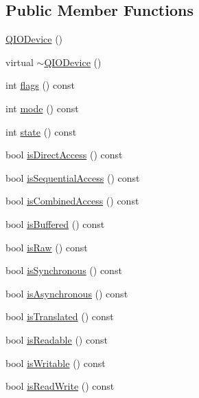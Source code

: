 \subsection*{Public Member Functions}
\begin{DoxyCompactItemize}
\item 
\mbox{\hyperlink{class_q_i_o_device_a6ccc9ce76acdca224d0c3ded7d303f02}{Q\+I\+O\+Device}} ()
\item 
virtual \mbox{\hyperlink{class_q_i_o_device_a2510afba0e06ba9edc0d518fa2a8d1fa}{$\sim$\+Q\+I\+O\+Device}} ()
\item 
int \mbox{\hyperlink{class_q_i_o_device_a3c3dd3eed081ff824acb10fa0eba9d91}{flags}} () const
\item 
int \mbox{\hyperlink{class_q_i_o_device_ad2a025933d4c1fc013f7c7f7ce2601ab}{mode}} () const
\item 
int \mbox{\hyperlink{class_q_i_o_device_a8529428353a81543a5a460797bf01c21}{state}} () const
\item 
bool \mbox{\hyperlink{class_q_i_o_device_ace782017b9a264d7d1759223add28ae7}{is\+Direct\+Access}} () const
\item 
bool \mbox{\hyperlink{class_q_i_o_device_ab0c6f50325bbf1e860aed41f3bfa498c}{is\+Sequential\+Access}} () const
\item 
bool \mbox{\hyperlink{class_q_i_o_device_a4cddfb1842e6392b0dbae21a217fef46}{is\+Combined\+Access}} () const
\item 
bool \mbox{\hyperlink{class_q_i_o_device_a643b4378bee07a7d8f6ab59dfd17df80}{is\+Buffered}} () const
\item 
bool \mbox{\hyperlink{class_q_i_o_device_a66e1eb78420a4ec15685871e2e773f68}{is\+Raw}} () const
\item 
bool \mbox{\hyperlink{class_q_i_o_device_ac425c50bec523a8f6bccfbe2c1934f19}{is\+Synchronous}} () const
\item 
bool \mbox{\hyperlink{class_q_i_o_device_a95291c3aa671e64d41e4320190f05f4e}{is\+Asynchronous}} () const
\item 
bool \mbox{\hyperlink{class_q_i_o_device_abf1df3cc1e0734c784c9d8eff82908c0}{is\+Translated}} () const
\item 
bool \mbox{\hyperlink{class_q_i_o_device_a3bba4665b92eabfeca6905e7561cc943}{is\+Readable}} () const
\item 
bool \mbox{\hyperlink{class_q_i_o_device_ab033a6ee76263214267daf8b62ade3c7}{is\+Writable}} () const
\item 
bool \mbox{\hyperlink{class_q_i_o_device_af362cdbc70c8cbd30bcb4aaaf7c8e9e2}{is\+Read\+Write}} () const

\end{DoxyCompactItemize}
